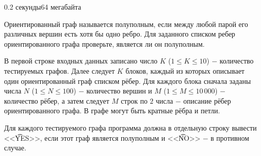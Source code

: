 \begin{problem}{}{}{}{0.2 секунды}{64 мегабайта}

Ориентированный граф называется полуполным,  если между любой парой его различных вершин есть хотя бы одно ребро. 
Для заданного списком ребер ориентированного графа проверьте, является ли он полуполным.

\InputFile
В первой строке входных данных записано число $K$ ($1 \le K \le 10$) $-$ количество тестируемых графов. 
Далее следует $K$ блоков, каждый из которых описывает один ориентированный граф списком рёбер. 
Для каждого блока сначала заданы числа $N$ ($1 \le N \le 100$) $-$ количество вершин и $M$ ($1 \le M \le 10\,000$) $-$
количество рёбер, а затем следует $M$ строк по $2$ числа $-$ описание рёбер ориентированного графа. В графе могут быть кратные рёбра
и петли.

\OutputFile
Для каждого тестируемого графа программа должна в отдельную строку вывести <<{\t{YES}}>>, если этот граф
является полуполным и <<{\t{NO}}>> $-$ в противном случае.

\Example

\begin{example}
%
\end{example}

\end{problem}

